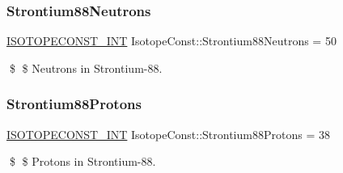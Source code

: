 \subsubsection{\texorpdfstring{Strontium88\+Neutrons}{Strontium88Neutrons}}
{\footnotesize\ttfamily \mbox{\hyperlink{group___isotope_const-_macros_ga5f18360b3e99483a35c32d789e62621c}{I\+S\+O\+T\+O\+P\+E\+C\+O\+N\+S\+T\+\_\+\+I\+NT}} Isotope\+Const\+::\+Strontium88\+Neutrons = 50}

\$ \$ Neutrons in Strontium-\/88. \mbox{\label{group___isotope_const-_strontium-_sr88_ga95cf00ea39fddaff85d31b0abead8e1d}} 
\subsubsection{\texorpdfstring{Strontium88\+Protons}{Strontium88Protons}}
{\footnotesize\ttfamily \mbox{\hyperlink{group___isotope_const-_macros_ga5f18360b3e99483a35c32d789e62621c}{I\+S\+O\+T\+O\+P\+E\+C\+O\+N\+S\+T\+\_\+\+I\+NT}} Isotope\+Const\+::\+Strontium88\+Protons = 38}

\$ \$ Protons in Strontium-\/88. 